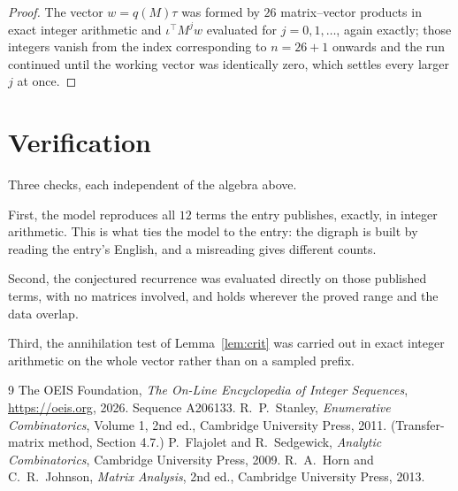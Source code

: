 \documentclass[11pt,a4paper]{article}
\theoremstyle{plain}
\theoremstyle{definition}
\begin{document}
\begin{proof}
The vector $w=q(M)\tau$ was formed by $26$ matrix--vector products in exact integer
arithmetic and $\iota^{\!\top}M^{j}w$ evaluated for $j=0,1,\dots$, again exactly; those
integers vanish from the index corresponding to $n=26+1$ onwards and the run continued
until the working vector was identically zero, which settles every larger $j$ at once.
\end{proof}

\section{Verification}

Three checks, each independent of the algebra above.

First, the model reproduces all $12$ terms the entry publishes, exactly, in integer
arithmetic. This is what ties the model to the entry: the digraph is built by reading the
entry's English, and a misreading gives different counts.

Second, the conjectured recurrence was evaluated directly on those published terms, with no
matrices involved, and holds wherever the proved range and the data overlap.

Third, the annihilation test of Lemma~\ref{lem:crit} was carried out in exact integer
arithmetic on the whole vector rather than on a sampled prefix.

\begin{thebibliography}{9}
 The OEIS Foundation, \emph{The On-Line Encyclopedia of Integer
Sequences}, \url{https://oeis.org}, 2026. Sequence A206133.
 R.~P.~Stanley, \emph{Enumerative Combinatorics}, Volume 1, 2nd ed.,
Cambridge University Press, 2011. (Transfer-matrix method, Section 4.7.)
 P.~Flajolet and R.~Sedgewick, \emph{Analytic Combinatorics}, Cambridge
University Press, 2009.
 R.~A.~Horn and C.~R.~Johnson, \emph{Matrix Analysis}, 2nd ed., Cambridge
University Press, 2013.
\end{thebibliography}
\end{document}
